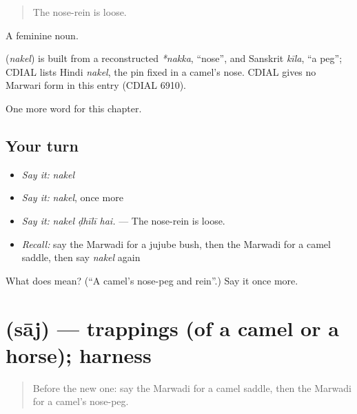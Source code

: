 \begin{quote}
The nose-rein is loose.
\end{quote}

A feminine noun.

\begin{cousinweb}
\textbf{} (\emph{nakel}) is built from a reconstructed \emph{*nakka}, \textquotedblleft{}nose\textquotedblright{}, and Sanskrit \emph{kīla}, \textquotedblleft{}a peg\textquotedblright{}; CDIAL lists Hindi \emph{nakel}, the pin fixed in a camel's nose. CDIAL gives no Marwari form in this entry (CDIAL 6910).
\end{cousinweb}

\begin{grammarlens}[title={What you've built}]
One more word for this chapter.
\end{grammarlens}

\subsection*{Your turn}
\begin{itemize}
\raggedright
  \item \emph{Say it:} \emph{nakel}
  \item \emph{Say it:} \emph{nakel}, once more
  \item \emph{Say it:} \emph{nakel ḍhīlī hai.} — The nose-rein is loose.
  \item \emph{Recall:} say the Marwadi for a jujube bush, then the Marwadi for a camel saddle, then say \emph{nakel} again
\end{itemize}

\begin{tcolorbox}[breakable,colback=teal!4,colframe=teal!35!black,title={Before you move on}]
What does  mean? (\textquotedblleft{}A camel's nose-peg and rein\textquotedblright{}.) Say it once more.
\end{tcolorbox}
\section[\texorpdfstring{\mw{साज} (sāj)}{साज (sāj)}]{ (sāj) — trappings (of a camel or a horse); harness}

\label{lesson:MW-C233-saj}



\begin{quote}
Before the new one: say the Marwadi for a camel saddle, then the Marwadi for a camel's nose-peg.
\end{quote}

